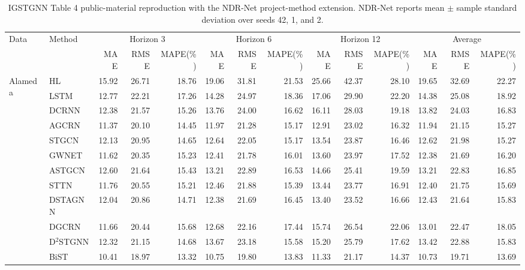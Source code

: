 \begin{table}
\centering
\caption{IGSTGNN Table 4 public-material reproduction with the NDR-Net project-method extension. NDR-Net reports mean $\pm$ sample standard deviation over seeds 42, 1, and 2.}
\label{tab:igstgnn-table4-with-ndr-extension}
\setlength{\tabcolsep}{3.0pt}
\begin{tabular}{llrrrrrrrrrrrr}
\toprule
Data & Method & \multicolumn{3}{c}{Horizon 3} & \multicolumn{3}{c}{Horizon 6} & \multicolumn{3}{c}{Horizon 12} & \multicolumn{3}{c}{Average} \\
\cmidrule(lr){3-5}\cmidrule(lr){6-8}\cmidrule(lr){9-11}\cmidrule(lr){12-14}
& & MAE & RMSE & MAPE(\%) & MAE & RMSE & MAPE(\%) & MAE & RMSE & MAPE(\%) & MAE & RMSE & MAPE(\%) \\
\midrule
\multirow{14}{*}{Alameda} & HL & 15.92 & 26.71 & 18.76 & 19.06 & 31.81 & 21.53 & 25.66 & 42.37 & 28.10 & 19.65 & 32.69 & 22.27 \\
 & LSTM & 12.77 & 22.21 & 17.26 & 14.28 & 24.97 & 18.36 & 17.06 & 29.90 & 22.20 & 14.38 & 25.08 & 18.92 \\
 & DCRNN & 12.38 & 21.57 & 15.26 & 13.76 & 24.00 & 16.62 & 16.11 & 28.03 & 19.18 & 13.82 & 24.03 & 16.83 \\
 & AGCRN & 11.37 & 20.10 & 14.45 & 11.97 & 21.28 & 15.17 & 12.91 & 23.02 & 16.32 & 11.94 & 21.15 & 15.27 \\
 & STGCN & 12.13 & 20.95 & 14.65 & 12.64 & 22.05 & 15.17 & 13.54 & 23.87 & 16.46 & 12.62 & 21.98 & 15.27 \\
 & GWNET & 11.62 & 20.35 & 15.23 & 12.41 & 21.78 & 16.01 & 13.60 & 23.97 & 17.52 & 12.38 & 21.69 & 16.20 \\
 & ASTGCN & 12.60 & 21.64 & 15.43 & 13.21 & 22.89 & 16.53 & 14.66 & 25.41 & 19.59 & 13.21 & 22.83 & 16.85 \\
 & STTN & 11.76 & 20.55 & 15.21 & 12.46 & 21.88 & 15.39 & 13.44 & 23.77 & 16.91 & 12.40 & 21.75 & 15.69 \\
 & DSTAGNN & 12.04 & 20.86 & 14.71 & 12.38 & 21.69 & 16.45 & 13.40 & 23.52 & 16.66 & 12.43 & 21.64 & 15.83 \\
 & DGCRN & 11.66 & 20.44 & 15.68 & 12.68 & 22.16 & 17.44 & 15.74 & 26.54 & 22.06 & 13.01 & 22.47 & 18.05 \\
 & D$^2$STGNN & 12.32 & 21.15 & 14.68 & 13.67 & 23.18 & 15.58 & 15.20 & 25.79 & 17.62 & 13.42 & 22.88 & 15.83 \\
 & BiST & 10.41 & 18.97 & 13.32 & 10.75 & 19.80 & 13.83 & 11.33 & 21.17 & 14.37 & 10.73 & 19.71 & 13.69 \\

\end{tabular}
\end{table}
